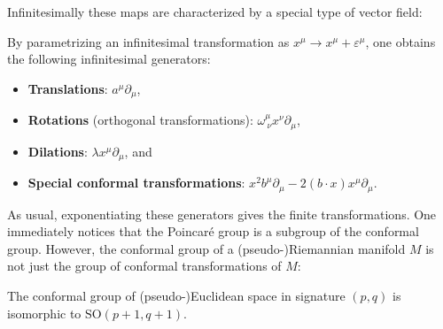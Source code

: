     Infinitesimally these maps are characterized by a special type of vector field:

    By parametrizing an infinitesimal transformation as $x^\mu\rightarrow x^\mu+\varepsilon^\mu$, one obtains the following infinitesimal generators:
    \begin{itemize}
        \item\textbf{Translations}: $a^\mu\partial_\mu$,
        \item\textbf{Rotations} (orthogonal transformations): $\omega^\mu_{\ \nu} x^\nu\partial_\mu$,
        \item\textbf{Dilations}: $\lambda x^\mu\partial_\mu$, and
        \item\textbf{Special conformal transformations}: $x^2b^\mu\partial_\mu - 2(b\cdot x)x^\mu\partial_\mu$.
    \end{itemize}
    As usual, exponentiating these generators gives the finite transformations. One immediately notices that the Poincar\'e group is a subgroup of the conformal group. However, the conformal group of a (pseudo-)Riemannian manifold $M$ is not just the group of conformal transformations of $M$:
    \begin{property}
        The conformal group of (pseudo-)Euclidean space in signature $(p,q)$ is isomorphic to $\mathrm{SO}(p+1,q+1)$.
    \end{property}

